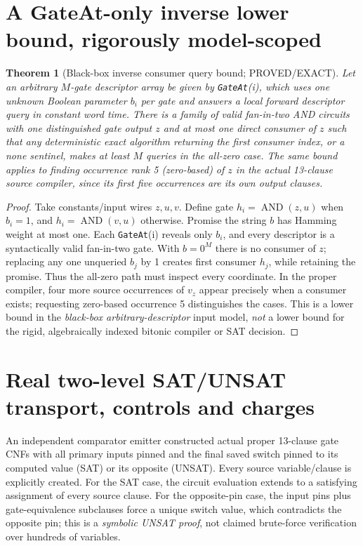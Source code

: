 \documentclass[11pt]{article}
\newtheorem{theorem}{Theorem}
\begin{document}
\section{A GateAt-only inverse lower bound, rigorously model-scoped}
\begin{theorem}[Black-box inverse consumer query bound; PROVED/EXACT]
Let an arbitrary $M$-gate descriptor array be given by \texttt{GateAt}(i), which uses one unknown Boolean parameter $b_i$ per gate and answers a local forward descriptor query in constant word time. There is a family of valid fan-in-two AND circuits with one distinguished gate output $z$ and \emph{at most one} direct consumer of $z$ such that any deterministic exact algorithm returning the first consumer index, or a none sentinel, makes at least $M$ queries in the all-zero case. The same bound applies to finding occurrence rank 5 (zero-based) of $z$ in the actual 13-clause source compiler, since its first five occurrences are its own output clauses.
\end{theorem}
\begin{proof}
Take constants/input wires $z,u,v$. Define gate $h_i=\operatorname{AND}(z,u)$ when $b_i=1$, and $h_i=\operatorname{AND}(v,u)$ otherwise. Promise the string $b$ has Hamming weight at most one. Each \texttt{GateAt}(i) reveals only $b_i$, and every descriptor is a syntactically valid fan-in-two gate. With $b=0^M$ there is no consumer of $z$; replacing any one unqueried $b_j$ by 1 creates first consumer $h_j$, while retaining the promise. Thus the all-zero path must inspect every coordinate. In the proper compiler, four more source occurrences of $v_z$ appear precisely when a consumer exists; requesting zero-based occurrence 5 distinguishes the cases. This is a lower bound in the \emph{black-box arbitrary-descriptor} input model, \emph{not} a lower bound for the rigid, algebraically indexed bitonic compiler or SAT decision.\end{proof}

\section{Real two-level SAT/UNSAT transport, controls and charges}
An independent comparator emitter constructed actual proper 13-clause gate CNFs with all primary inputs pinned and the final saved switch pinned to its computed value (SAT) or its opposite (UNSAT). Every source variable/clause is explicitly created. For the SAT case, the circuit evaluation extends to a satisfying assignment of every source clause. For the opposite-pin case, the input pins plus gate-equivalence subclauses force a unique switch value, which contradicts the opposite pin; this is a \emph{symbolic UNSAT proof}, not claimed brute-force verification over hundreds of variables.
\end{document}
